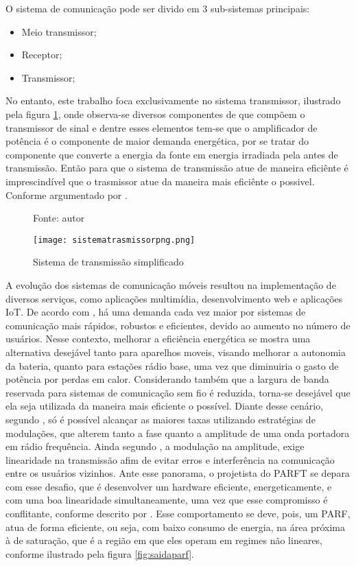 O sistema de comunicação pode ser divido em 3 sub-sistemas principais:
\begin{itemize}
    \item Meio transmissor;
    \item Receptor;
    \item Transmissor;
\end{itemize}

No entanto, este trabalho foca exclusivamente no sistema transmissor, ilustrado pela figura \ref{fig:sistemadetrasmissao}, onde observa-se diversos componentes de que compõem o transmissor de sinal e dentre esses elementos tem-se que o amplificador de potência é o componente de maior demanda energética, por se tratar do componente que converte a energia da fonte em energia irradiada pela antes de transmissão. Então para que o sistema de transmissão atue de maneira eficiênte é imprescindível que o trasmissor atue da maneira mais eficiênte o possivel. Conforme argumentado por \cite{Schuartz2017}.

\begin{figure}[ht!]
    \centering
    \captionsetup{justification=centering}
    \caption*{Fonte: autor}
    \texttt{[image: sistematrasmissorpng.png]}
    \caption{Sistema de transmissão simpliﬁcado}
    \label{fig:sistemadetrasmissao}
\end{figure}

A evolução dos sistemas de comunicação móveis resultou na implementação de diversos serviços, como aplicações multimídia, desenvolvimento web e aplicações IoT. De acordo com \cite{John2016}, há uma demanda cada vez maior por sistemas de comunicação mais rápidos, robustos e eficientes, devido ao aumento no número de usuários.  Nesse contexto, melhorar a eficiência energética se mostra uma alternativa desejável tanto para aparelhos moveis, visando melhorar a autonomia da bateria, quanto para estações rádio base, uma vez que diminuiria o gasto de potência por perdas em calor. Considerando também que a largura de banda reservada para sistemas de comunicação sem fio é reduzida, torna-se desejável que ela seja utilizada da maneira mais eficiente o possível. Diante desse cenário, segundo \cite{Kenington2000}, só é possível alcançar as maiores taxas utilizando estratégias de modulações, que alterem tanto a fase quanto a amplitude de uma onda portadora em rádio frequência. Ainda segundo \cite{Kenington2000}, a modulação na amplitude, exige linearidade na transmissão afim de evitar erros e interferência na comunicação entre os usuários vizinhos. Ante esse panorama, o projetista do PARFT se depara com esse desafio, que é desenvolver um hardware eficiente, energeticamente, e com uma boa linearidade simultaneamente, uma vez que esse compromisso é conflitante, conforme descrito por \cite{Cripps2006}. Esse comportamento se deve, pois, um PARF, atua de forma eficiente, ou seja, com baixo consumo de energia, na área próxima à de saturação, que é a região em que eles operam em regimes não lineares, conforme ilustrado pela figura \ref{fig:saidaparf}.

